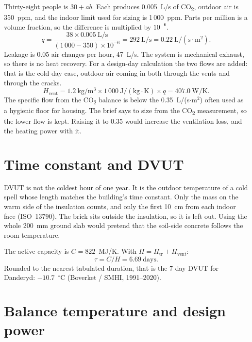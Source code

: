 \documentclass[11pt,a4paper]{article}
\newcommand{\degC}{\ensuremath{^{\circ}\mathrm{C}}}
\begin{document}
Thirty-eight people is $30 + ab$. Each produces 0.005~L/s of CO\textsubscript{2},
outdoor air is 350~ppm, and the indoor limit used for sizing is 1\,000~ppm.
Parts per million is a volume fraction, so the difference is multiplied
by $10^{-6}$.
\begin{equation}
  q = \frac{38 \times 0.005~\mathrm{L/s}}{(1\,000 - 350)\times 10^{-6}}
    = 292~\mathrm{L/s}
    = 0.22~\mathrm{L/(s{\cdot}m^{2})}.
  \label{eq:vent}
\end{equation}
Leakage is 0.05 air changes per hour, 47~L/s. The system is mechanical
exhaust, so there is no heat recovery. For a design-day calculation the
two flows are added: that is the cold-day case, outdoor air coming in
both through the vents and through the cracks.
\begin{equation}
  H_{\mathrm{vent}}
  = 1.2~\mathrm{kg/m^{3}} \times 1\,000~\mathrm{J/(kg{\cdot}K)} \times q
  = 407.0~\mathrm{W/K}.
  \label{eq:hvent}
\end{equation}
The specific flow from the CO\textsubscript{2} balance is below the
0.35~L/(s$\cdot$m$^{2}$) often used as a hygienic floor for housing.
The brief says to size from the CO\textsubscript{2} measurement, so the
lower flow is kept. Raising it to 0.35 would increase the ventilation
loss, and the heating power with it.

\section{Time constant and DVUT}

DVUT is not the coldest hour of one year. It is the outdoor temperature
of a cold spell whose length matches the building's time constant.
Only the mass on the warm side of the insulation counts, and only the
first 10~cm from each indoor face (ISO~13790). The brick sits outside
the insulation, so it is left out. Using the whole 200~mm ground slab
would pretend that the soil-side concrete follows the room temperature.

The active capacity is $C = 822$~MJ/K. With
$H = H_{\mathrm{tr}} + H_{\mathrm{vent}}$:
\begin{equation}
  \tau = C / H = 6.69~\mathrm{days}.
  \label{eq:tau}
\end{equation}
Rounded to the nearest tabulated duration, that is the 7-day DVUT for
Danderyd: $-10.7$~\degC{} (Boverket / SMHI, 1991--2020).

\section{Balance temperature and design power}
\end{document}
